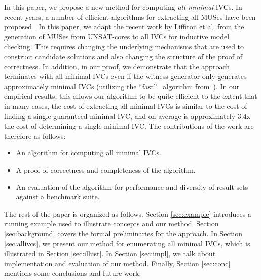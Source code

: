 In this paper, we propose a new method for computing \emph{all minimal} IVCs. In  recent  years,  a  number  of  efficient
algorithms  for  extracting  all MUSes  have  been proposed \cite{Bacchus2016, bacchus2015using, belov2012muser2, belov2013core, belov2012towards, nadel2014accelerated, liffiton2005max}.  In this paper, we adapt the recent work by Liffiton et al. \cite{marco2016fast} from the generation of MUSes from UNSAT-cores to all IVCs for inductive model checking.  This requires changing the underlying mechanisms that are used to construct candidate solutions and also changing the structure of the proof of correctness.  In addition, in our proof, we demonstrate that the approach terminates with all minimal IVCs even if the witness generator only generates approximately minimal IVCs (utilizing the ``fast'' \ucalg\ algorithm from~\cite{Ghass16}).  In our empirical results, this allows our algorithm to be quite efficient to the extent that in many cases, the cost of extracting all minimal IVCs is similar to the cost of finding a single guaranteed-minimal IVC, and on average is approximately 3.4x the cost of determining a single minimal IVC.
The contributions of the work are therefore as follows:
\begin{itemize}
    \item An algorithm for computing all minimal IVCs.
    \item A proof of correctness and completeness of the algorithm.
    \item An evaluation of the algorithm for performance and diversity of result sets against a benchmark suite. \end{itemize}



The rest of the paper is organized as follows.
Section \ref{sec:example} introduces a running example used to illustrate concepts and our method.
Section \ref{sec:background} covers the formal preliminaries for the approach.
In Section \ref{sec:allivcs}, we present our method for enumerating all minimal IVCs,
which is illustrated in
Section \ref{sec:illust}. In Section \ref{sec:impl}, we talk about implementation and evaluation of our method. Finally, Section \ref{sec:conc} mentions some conclusions and future work. 